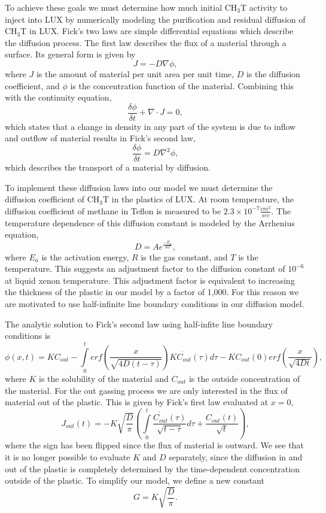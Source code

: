\documentclass[a4paper,12pt]{article}
\begin{document}
To achieve these goals we must determine how much initial CH$_3$T activity to inject into LUX by numerically modeling the purification and residual diffusion of CH$_3$T in LUX.  Fick's two laws are simple differential equations which describe the diffusion process.  The first law describes the flux of a material through a surface.  Its general form is given by
\[J=-D \nabla \phi,\]
where $J$ is the amount of material per unit area per unit time, $D$ is the diffusion coefficient, and $\phi$ is the concentration function of the material. Combining this with the continuity equation,
\[\frac{\delta\phi}{\delta t} + \nabla \cdot J =0,\]
which states that a change in density in any part of the system is due to inflow and outflow of material results in Fick's second law,
\[\frac{\delta \phi}{\delta t} = D \nabla^2\phi,\]
which describes the transport of a material by diffusion.

To implement these diffusion laws into our model we must determine the diffusion coefficient of CH$_3$T in the plastics of LUX.  At room temperature, the diffusion coefficient of methane in Teflon is measured to be $2.3 \times 10^{-7} \frac{cm^2}{sec} $. \cite{Miyake}  The temperature dependence of this diffusion constant is modeled by the Arrhenius equation,
\[D=Ae^{\frac{-E_a}{RT}},\]
where $E_a$ is the activation energy, $R$ is the gas constant, and $T$ is the temperature.  This suggests an adjustment factor to the diffusion constant of $10^{-6}$ at liquid xenon temperature.  This adjustment factor is equivalent to increasing the thickness of the plastic in our model by a factor of 1,000.  For this reason we are motivated to use half-infinite line boundary conditions in our diffusion model.

The analytic solution to Fick's second law using half-infite line boundary conditions is
\[\phi (x,t) = KC_{out} - \int \limits_0^t erf(\frac{x}{\sqrt{4D(t - \tau)}})K\dot{C_{out}}(\tau)d\tau - KC_{out}(0)erf(\frac{x}{\sqrt{4Dt}}),\]
where $K$ is the solubility of the material and $C_{out}$ is the outside concentration of the material. \cite{Piche} For the out gassing process we are only interested in the flux of material out of the plastic.  This is given by Fick's first law evaluated at $x=0$,
\[J_{out}(t)= - K \sqrt{\frac{D}{\pi}}( \int \limits_0^t \frac{\dot{C_{out}}(\tau)}{\sqrt{t-\tau}} d \tau + \frac{C_{out}(t)}{\sqrt{t}}),\]
where the sign has been flipped since the flux of material is outward.  We see that it is no longer possible to evaluate $K$ and $D$ separately, since the diffusion in and out of the plastic is completely determined by the time-dependent concentration outside of the plastic.  To simplify our model, we define a new constant
\[ G = K \sqrt{ \frac{D}{ \pi }} .\]
\end{document}
